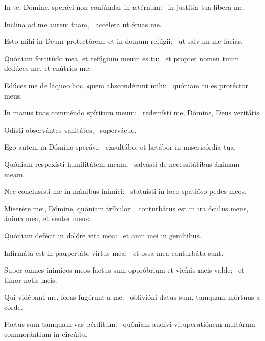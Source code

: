 \item In te, Dómine, sperávi non confúndar in ætérnum:~\psstar{} in justítia tua líbera me.

\item Inclína ad me aurem tuam,~\psstar{} accélera ut éruas me.

\item Esto mihi in Deum protectórem, et in domum refúgii:~\psstar{} ut salvum me fácias.

\item Quóniam fortitúdo mea, et refúgium meum es tu:~\psstar{} et propter nomen tuum dedúces me, et enútries me.

\item Edúces me de láqueo hoc, quem abscondérunt mihi:~\psstar{} quóniam tu es protéctor meus.

\item In manus tuas comméndo spíritum meum:~\psstar{} redemísti me, Dómine, Deus veritátis.

\item Odísti observántes vanitátes,~\psstar{} supervácue.

\item Ego autem in Dómino sperávi:~\psstar{} exsultábo, et lætábor in misericórdia tua.

\item Quóniam respexísti humilitátem meam,~\psstar{} salvásti de necessitátibus ánimam meam.

\item Nec conclusísti me in mánibus inimíci:~\psstar{} statuísti in loco spatióso pedes meos.

\item Miserére mei, Dómine, quóniam tríbulor:~\pscross{} conturbátus est in ira óculus meus,~\psstar{} ánima mea, et venter meus:

\item Quóniam defécit in dolóre vita mea:~\psstar{} et anni mei in gemítibus.

\item Infirmáta est in paupertáte virtus mea:~\psstar{} et ossa mea conturbáta sunt.

\item Super omnes inimícos meos factus sum oppróbrium et vicínis meis valde:~\psstar{} et timor notis meis.

\item Qui vidébant me, foras fugérunt a me:~\psstar{} oblivióni datus sum, tamquam mórtuus a corde.

\item Factus sum tamquam vas pérditum:~\psstar{} quóniam audívi vituperatiónem multórum commorántium in circúitu.

